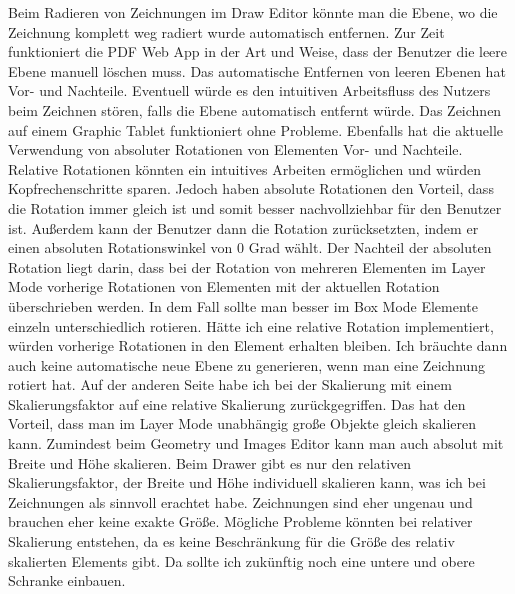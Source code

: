Beim Radieren von Zeichnungen im Draw Editor könnte man die Ebene, wo die Zeichnung komplett weg radiert wurde automatisch entfernen. Zur Zeit funktioniert die PDF Web App in der Art und Weise, dass der Benutzer die leere Ebene manuell löschen muss. Das automatische Entfernen von leeren Ebenen hat Vor- und Nachteile. Eventuell würde es den intuitiven Arbeitsfluss des Nutzers beim Zeichnen stören, falls die Ebene automatisch entfernt würde. Das Zeichnen auf einem Graphic Tablet funktioniert ohne Probleme. Ebenfalls hat die aktuelle Verwendung von absoluter Rotationen von Elementen Vor- und Nachteile. Relative Rotationen könnten ein intuitives Arbeiten ermöglichen und würden Kopfrechenschritte sparen. Jedoch haben absolute Rotationen den Vorteil, dass die Rotation immer gleich ist und somit besser nachvollziehbar für den Benutzer ist. Außerdem kann der Benutzer dann die Rotation zurücksetzten, indem er einen absoluten Rotationswinkel von 0 Grad wählt. Der Nachteil der absoluten Rotation liegt darin, dass bei der Rotation von mehreren Elementen im Layer Mode vorherige Rotationen von Elementen mit der aktuellen Rotation überschrieben werden. In dem Fall sollte man besser im Box Mode Elemente einzeln unterschiedlich rotieren. Hätte ich eine relative Rotation implementiert, würden vorherige Rotationen in den Element erhalten bleiben. Ich bräuchte dann auch keine automatische neue Ebene zu generieren, wenn man eine Zeichnung rotiert hat. Auf der anderen Seite habe ich bei der Skalierung mit einem Skalierungsfaktor auf eine relative Skalierung zurückgegriffen. Das hat den Vorteil, dass man im Layer Mode unabhängig große Objekte gleich skalieren kann. Zumindest beim Geometry und Images Editor kann man auch absolut mit Breite und Höhe skalieren. Beim Drawer gibt es nur den relativen Skalierungsfaktor, der Breite und Höhe individuell skalieren kann, was ich bei Zeichnungen als sinnvoll erachtet habe. Zeichnungen sind eher ungenau und brauchen eher keine exakte Größe. Mögliche Probleme könnten bei relativer Skalierung entstehen, da es keine Beschränkung für die Größe des relativ skalierten Elements gibt. Da sollte ich zukünftig noch eine untere und obere Schranke einbauen. \\
